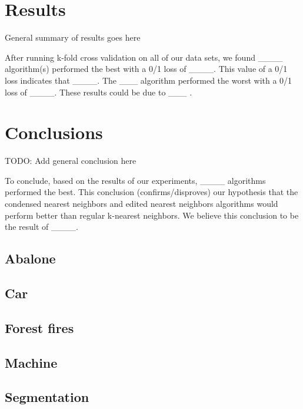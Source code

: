 \documentclass[twoside,11pt]{article}
\begin{document}
\section{Results}
General summary of results goes here

After running k-fold cross validation on all of our data sets, we found \_\_\_\_ algorithm(s) performed the best with a 0/1 loss of \_\_\_\_. This value of a 0/1 loss indicates that \_\_\_\_. The \_\_\_ algorithm performed the worst with a 0/1 loss of \_\_\_\_. These results could be due to \_\_\_ . 

\section{Conclusions}

TODO: Add general conclusion here

To conclude, based on the results of our experiments, \_\_\_\_ algorithms performed the best. This conclusion (confirms/disproves) our hypothesis that the condensed nearest neighbors and edited nearest neighbors algorithms would perform better than regular k-nearest neighbors. We believe this conclusion to be the result of \_\_\_\_.

\subsection{Abalone}

\subsection{Car}

\subsection{Forest fires}

\subsection{Machine}

\subsection{Segmentation}


\acks{}
\end{document}
